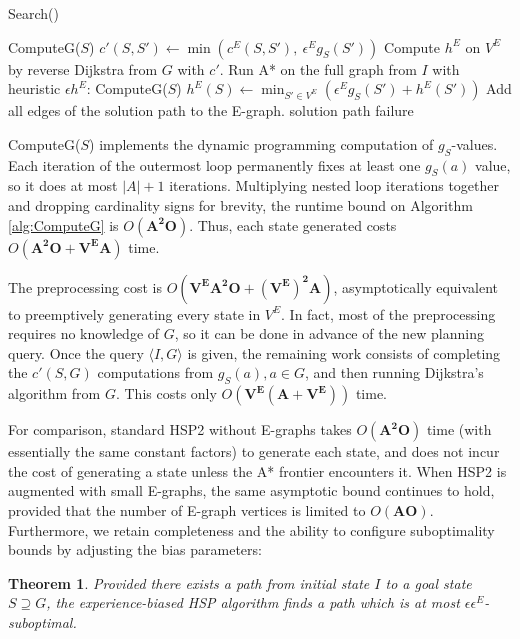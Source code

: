\documentclass[letterpaper]{article}
\newtheorem{thm}{Theorem}
\begin{document}
\begin{algorithm}
\caption{Search()}
\label{alg:Search}
\begin{algorithmic}
\STATE ComputeG($S$)
\STATE $c'(S,S') \leftarrow \min\left(c^E(S,S'),~\epsilon^E g_S(S')\right)$
\ENDFOR
\ENDFOR
\STATE Compute $h^E$ on $V^E$ by reverse Dijkstra from $G$ with $c'$.
\STATE Run A* on the full graph from $I$ with heuristic $\epsilon h^E$:
\STATE ComputeG($S$)
\STATE $h^E(S) \leftarrow \min_{S'\in V^E} \left( \epsilon^E g_S(S') + h^E(S') \right)$
\ENDFOR
{}
\STATE Add all edges of the solution path to the E-graph.
\RETURN solution path
\ELSE
\RETURN failure
\ENDIF
\end{algorithmic}
\end{algorithm}

ComputeG($S$) implements the dynamic programming computation of $g_S$-values.
Each iteration of the outermost loop permanently fixes at least one $g_S(a)$ value, so it does at most $|A|+1$ iterations.
Multiplying nested loop iterations together and dropping cardinality signs for brevity, the runtime bound on Algorithm \ref{alg:ComputeG} is $O(\mathbf{A^2O})$.
Thus, each state generated costs $O(\mathbf{A^2O + V^EA})$ time.

The preprocessing cost is $O(\mathbf{V^EA^2O + (V^E)^2A})$, asymptotically equivalent to preemptively generating every state in $V^E$.
In fact, most of the preprocessing requires no knowledge of $G$, so it can be done in advance of the new planning query. Once the query $\langle I,G\rangle$ is given, the remaining work consists of completing the $c'(S,G)$ computations from $g_S(a),a\in G$, and then running Dijkstra's algorithm from $G$. This costs only $O(\mathbf{V^E(A + V^E)})$ time.

For comparison, standard HSP2 without E-graphs takes $O(\mathbf{A^2O})$ time (with essentially the same constant factors) to generate each state, and does not incur the cost of generating a state unless the A* frontier encounters it.
When HSP2 is augmented with small E-graphs, the same asymptotic bound continues to hold, provided that the number of E-graph vertices is limited to $O(\mathbf{AO})$. Furthermore, we retain completeness and the ability to configure suboptimality bounds by adjusting the bias parameters:

\begin{thm}
Provided there exists a path from initial state $I$ to a goal state $S\supseteq G$, the experience-biased HSP algorithm finds a path which is at most $\epsilon\epsilon^E$-suboptimal.
\end{thm}
\end{document}
